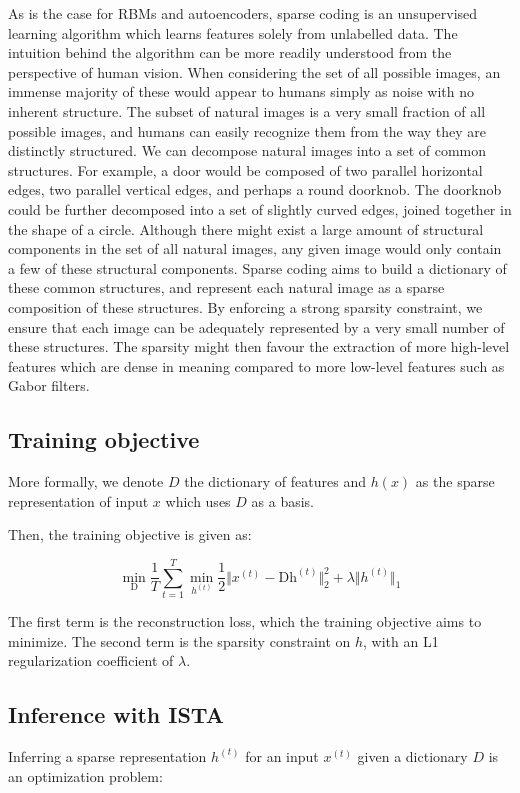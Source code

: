 \documentclass{article} %
\begin{document}
As is the case for RBMs and autoencoders, sparse coding is an unsupervised learning algorithm which learns features solely from unlabelled data. The intuition behind the algorithm can be more readily understood from the perspective of human vision. When considering the set of all possible images, an immense majority of these would appear to humans simply as noise with no inherent structure. The subset of natural images is a very small fraction of all possible images, and humans can easily recognize them from the way they are distinctly structured. We can decompose natural images into a set of common structures. For example, a door would be composed of two parallel horizontal edges, two parallel vertical edges, and perhaps a round doorknob. The doorknob could be further decomposed into a set of slightly curved edges, joined together in the shape of a circle. Although there might exist a large amount of structural components in the set of all natural images, any given image would only contain a few of these structural components. Sparse coding aims to build a dictionary of these common structures, and represent each natural image as a sparse composition of these structures. By enforcing a strong sparsity constraint, we ensure that each image can be adequately represented by a very small number of these structures. The sparsity might then favour the extraction of more high-level features which are dense in meaning compared to more low-level features such as Gabor filters.

\subsection{Training objective}
More formally, we denote $D$ the dictionary of features and $h(x)$ as the sparse representation of input $x$ which uses $D$ as a basis.

Then, the training objective is given as:

\begin{equation}
\min_{\text{D}} \frac{1}{T} \sum_{t=1}^{T} \min_{h^{(t)}} \frac{1}{2} \Vert x^{(t)} - \text{D} \text{h}^{(t)} \Vert_{2}^{2} + \lambda \Vert h^{(t)} \Vert_{1}
\end{equation}

The first term is the reconstruction loss, which the training objective aims to minimize. The second term is the sparsity constraint on $h$, with an L1 regularization coefficient of $\lambda$.

\subsection{Inference with ISTA}
Inferring a sparse representation $h^{(t)}$ for an input $x^{(t)}$ given a dictionary $D$ is an optimization problem:
\end{document}
